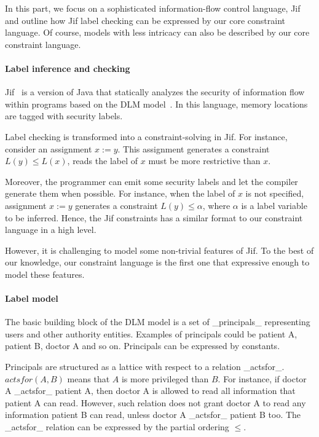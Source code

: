 In this part, we focus on a sophisticated information-flow control language,
Jif~\cite{jif} and outline how Jif label checking can be expressed by our core
constraint language. Of course, models with less intricacy can also be
described by our core constraint language.
 
\paragraph{Label inference and checking}

Jif~\cite{jif} is a version of Java that statically analyzes the security of
information flow within programs based on the DLM model~\cite{ml-ifc-97}. In
this language, memory locations are tagged with security labels.

Label checking is transformed into a constraint-solving in Jif. For instance,
consider an assignment $x := y$. This assignment generates a constraint
$L(y)\leq L(x)$, reads the label of $x$ must be more restrictive than $x$.

Moreover, the programmer can emit some security labels and let the compiler
generate them when possible. For instance, when the label of $x$ is not
specified, assignment $x := y$ generates a constraint $L(y)\leq \alpha$, where
$\alpha$ is a label variable to be inferred. Hence, the Jif constraints has a
similar format to our constraint language in a high level. 

However, it is challenging to model some non-trivial features of Jif. To the
best of our knowledge, our constraint language is the first one that expressive
enough to model these features.

\paragraph{Label model}

The basic building block of the DLM model is a set of _principals_ representing
users and other authority entities. Examples of principals could be patient A,
patient B, doctor A and so on. Principals can be expressed by constants.

Principals are structured as a lattice with respect to a relation _actsfor_.
$actsfor(A,B)$ means that $A$ is more privileged than $B$.
% 
For instance, if doctor A _actsfor_ patient A, then doctor A is allowed to read
all information that patient A can read. However, such relation does not grant
doctor A to read any information patient B can read, unless doctor A _actsfor_
patient B too. The _actsfor_ relation can be expressed by the partial ordering
$\leq$.

